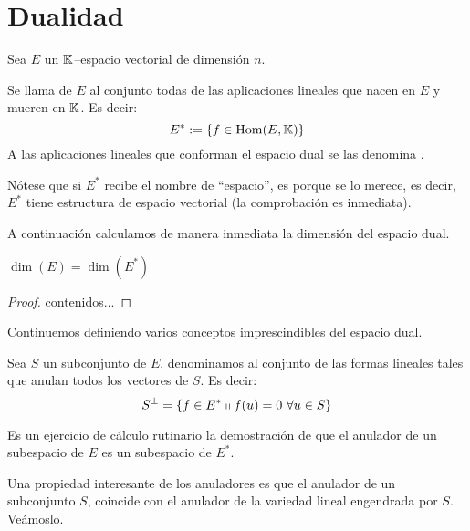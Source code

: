 \section{Dualidad}
Sea $E$ un $\mathbb{K}$--espacio vectorial de dimensión $n$.
\begin{defi}
	Se llama  de $E$ al conjunto todas de las aplicaciones lineales que nacen en $E$ y mueren en $\mathbb{K}$. Es decir:
	\[E^*:=\{f\in\mathrm{Hom}(E,\mathbb{K})\}\]
	A las aplicaciones lineales que conforman el espacio dual se las denomina .
\end{defi}
Nótese que si $E^*$ recibe el nombre de ``espacio'', es porque se lo merece, es decir, $E^*$ tiene estructura de espacio vectorial (la comprobación es inmediata).

A continuación calculamos de manera inmediata la dimensión del espacio dual.
\begin{lem}
	$\dim(E)=\dim(E^*)$
\end{lem}
\begin{proof}
	contenidos...
\end{proof}

Continuemos definiendo varios conceptos imprescindibles del espacio dual.
\begin{defi}
	\label{A1_def_anulador}
	Sea $S$ un subconjunto de $E$, denominamos  al conjunto de las formas lineales tales que anulan todos los vectores de $S$. Es decir:
	\[S^{\perp}=\{f\in E^*\tq f(u)=0\ \forall u\in S\}\]
\end{defi}
Es un ejercicio de cálculo rutinario la demostración de que el anulador de un subespacio de $E$ es un subespacio de $E^*$.

Una propiedad interesante de los anuladores es que el anulador de un subconjunto $S$, coincide con el anulador de la variedad lineal engendrada por $S$. Veámoslo.

